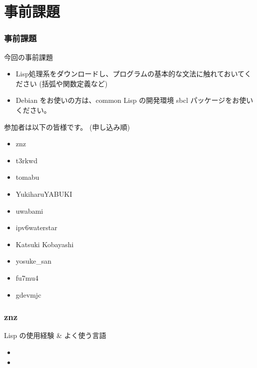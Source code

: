\documentclass[cjk,dvipdfmx,12pt,compress,%
hyperref={bookmarks=true,bookmarksnumbered=true,bookmarksopen=false,%
colorlinks=false,%
pdftitle={第 120 回 関西 Debian 勉強会},%
pdfauthor={倉敷・のがた・佐々木・かわだ・おおつき},%
pdfsubject={資料},%
}]{beamer}
\begin{document}

\section{事前課題}

\begin{frame}[fragile]
  \frametitle{事前課題}
  \begin{block}{今回の事前課題}
   \begin{itemize}
    \item Lisp処理系をダウンロードし、プログラムの基本的な文法に触れておいてください (括弧や関数定義など)
    \item Debian をお使いの方は、common Lisp の開発環境 sbcl パッケージをお使いください。 
   \end{itemize}
  \end{block}
\end{frame}

\begin{frame}[fragile]
参加者は以下の皆様です。 (申し込み順)
\begin{itemize}
\item znz
\item t3rkwd
\item tomabu
\item YukiharuYABUKI
\item uwabami
\item ipv6waterstar
\item Katsuki Kobayashi
\item yosuke\_san
\item fu7mu4
\item gdevmjc 
\end{itemize}
\end{frame}


\begin{frame}[fragile]
  \frametitle{znz}
  \begin{block}{Lisp の使用経験 \& よく使う言語}
    \begin{itemize}
      \item 
      \item 
    \end{itemize}
  \end{block}
\end{frame}
\end{document}
